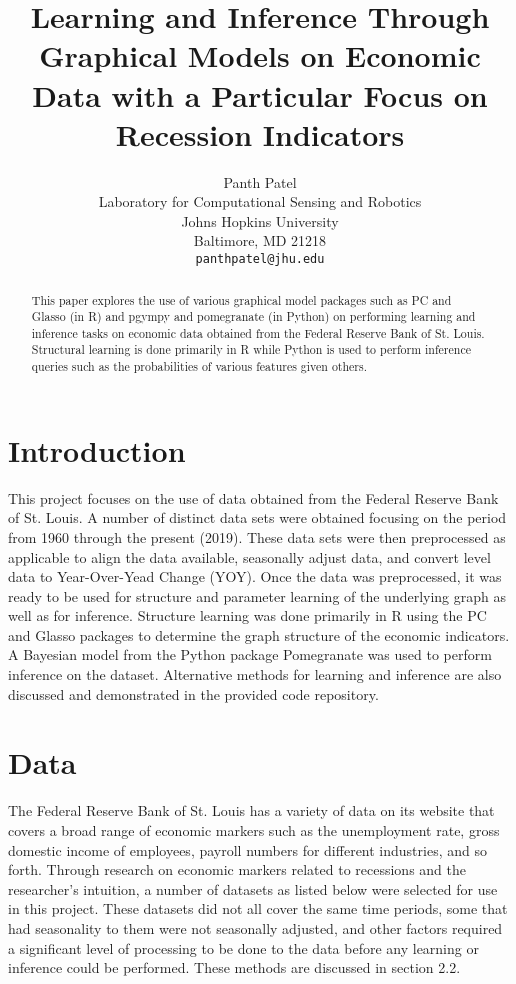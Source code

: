 \documentclass{article}
\title{Learning and Inference Through Graphical Models on Economic Data with a Particular Focus on Recession Indicators}
\author{%
 Panth Patel\\
  Laboratory for Computational Sensing and Robotics\\
  Johns Hopkins University\\
  Baltimore, MD 21218 \\
  \texttt{panthpatel@jhu.edu} \\
}
\begin{document}

\maketitle

\begin{abstract}
  This paper explores the use of various graphical model packages such as PC and Glasso (in R) and pgympy and pomegranate (in Python) on performing learning and inference tasks on economic data obtained from the Federal Reserve Bank of St. Louis. Structural learning is done primarily in R while Python is used to perform inference queries such as the probabilities of various features given others.
\end{abstract}

\section{Introduction}

This project focuses on the use of data obtained from the Federal Reserve Bank of St. Louis. A number of distinct data sets were obtained focusing on the period from 1960 through the present (2019). These data sets were then preprocessed as applicable to align the data available, seasonally adjust data, and convert level data to Year-Over-Yead Change (YOY). Once the data was preprocessed, it was ready to be used for structure and parameter learning of the underlying graph as well as for inference. Structure learning was done primarily in R using the PC and Glasso packages to determine the graph structure of the economic indicators. A Bayesian model from the Python package Pomegranate was used to perform inference on the dataset. Alternative methods for learning and inference are also discussed and demonstrated in the provided code repository.

\section{Data}
\label{gen_inst}

The Federal Reserve Bank of St. Louis has a variety of data on its website that covers a broad range of economic markers such as the unemployment rate, gross domestic income of employees, payroll numbers for different industries, and so forth. Through research on economic markers related to recessions and the researcher's intuition, a number of datasets as listed below were selected for use in this project. These datasets did not all cover the same time periods, some that had seasonality to them were not seasonally adjusted, and other factors required a significant level of processing to be done to the data before any learning or inference could be performed. These methods are discussed in section 2.2.
\end{document}
